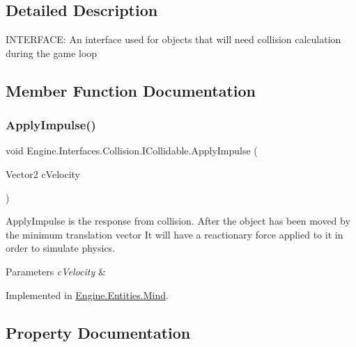 \subsection{Detailed Description}
I\+N\+T\+E\+R\+F\+A\+CE\+: An interface used for objects that will need collision calculation during the game loop 



\subsection{Member Function Documentation}
\mbox{\label{a00426_a000ca0336b06e3f2d658d442a83dbbbb}} 
\subsubsection{\texorpdfstring{Apply\+Impulse()}{ApplyImpulse()}}
{\footnotesize\ttfamily void Engine.\+Interfaces.\+Collision.\+I\+Collidable.\+Apply\+Impulse (\begin{DoxyParamCaption}\item[{Vector2}]{c\+Velocity }\end{DoxyParamCaption})}



Apply\+Impulse is the response from collision. After the object has been moved by the minimum translation vector It will have a reactionary force applied to it in order to simulate physics. 


\begin{DoxyParams}{Parameters}
{\em c\+Velocity} & \\
\hline
\end{DoxyParams}


Implemented in \hyperlink{a00318_a378218df0a8c27a981e98167197d9c16}{Engine.\+Entities.\+Mind}.



\subsection{Property Documentation}
\mbox{\label{a00426_aa4cbc57adf743bacff53f85bb4a2fcf3}} 

